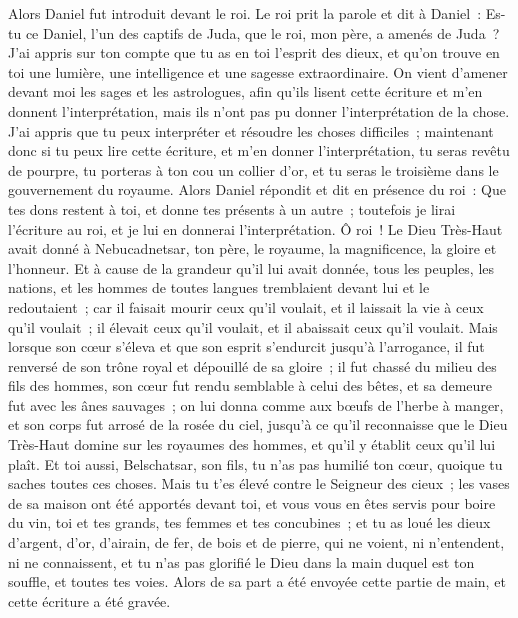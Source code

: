 \begin{multicols}{2}
Alors Daniel fut introduit devant le roi. Le roi prit la parole et dit à Daniel~: Es-tu ce Daniel, l'un des captifs de Juda, que le roi, mon père, a amenés de Juda~?
J'ai appris sur ton compte que tu as en toi l'esprit des dieux, et qu'on trouve en toi une lumière, une intelligence et une sagesse extraordinaire.
On vient d'amener devant moi les sages et les astrologues, afin qu'ils lisent cette écriture et m'en donnent l'interprétation, mais ils n'ont pas pu donner l'interprétation de la chose.
J'ai appris que tu peux interpréter et résoudre les choses difficiles~; maintenant donc si tu peux lire cette écriture, et m'en donner l'interprétation, tu seras revêtu de pourpre, tu porteras à ton cou un collier d'or, et tu seras le troisième dans le gouvernement du royaume.
Alors Daniel répondit et dit en présence du roi~: Que tes dons restent à toi, et donne tes présents à un autre~; toutefois je lirai l'écriture au roi, et je lui en donnerai l'interprétation.
Ô roi~! Le Dieu Très-Haut avait donné à Nebucadnetsar, ton père, le royaume, la magnificence, la gloire et l'honneur.
Et à cause de la grandeur qu'il lui avait donnée, tous les peuples, les nations, et les hommes de toutes langues tremblaient devant lui et le redoutaient~; car il faisait mourir ceux qu'il voulait, et il laissait la vie à ceux qu'il voulait~; il élevait ceux qu'il voulait, et il abaissait ceux qu'il voulait.
Mais lorsque son cœur s'éleva et que son esprit s'endurcit jusqu'à l'arrogance, il fut renversé de son trône royal et dépouillé de sa gloire~;
il fut chassé du milieu des fils des hommes, son cœur fut rendu semblable à celui des bêtes, et sa demeure fut avec les ânes sauvages~; on lui donna comme aux bœufs de l'herbe à manger, et son corps fut arrosé de la rosée du ciel, jusqu'à ce qu'il reconnaisse que le Dieu Très-Haut domine sur les royaumes des hommes, et qu'il y établit ceux qu'il lui plaît.
Et toi aussi, Belschatsar, son fils, tu n'as pas humilié ton cœur, quoique tu saches toutes ces choses.
Mais tu t'es élevé contre le Seigneur des cieux~; les vases de sa maison ont été apportés devant toi, et vous vous en êtes servis pour boire du vin, toi et tes grands, tes femmes et tes concubines~; et tu as loué les dieux d'argent, d'or, d'airain, de fer, de bois et de pierre, qui ne voient, ni n'entendent, ni ne connaissent, et tu n'as pas glorifié le Dieu dans la main duquel est ton souffle, et toutes tes voies.
Alors de sa part a été envoyée cette partie de main, et cette écriture a été gravée.

\end{multicols}

